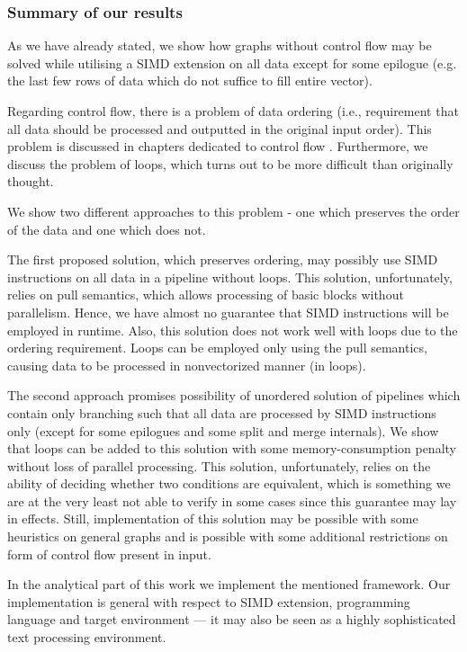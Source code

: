\subsubsection{Summary of our results}

  As we have already stated, we show how graphs without control flow may be solved while utilising a SIMD extension on all data except for some epilogue (e.g. the last few rows of data which do not suffice to fill entire vector). 


  Regarding control flow, there is a problem of data ordering (i.e., requirement that all data should be processed and outputted in the original input order). This problem is discussed in chapters dedicated to control flow .  Furthermore, we discuss the problem of loops, which turns out to be more difficult than originally thought.  


We show two different approaches to this problem - one which preserves the order of the data and one which does not. 


  The first proposed solution, which preserves ordering, may possibly use SIMD instructions on all data in a pipeline without loops. This solution, unfortunately, relies on pull semantics, which allows processing of basic blocks without parallelism. Hence, we have almost no guarantee that SIMD instructions will be employed in runtime. Also, this solution does not work well with loops due to the ordering requirement. Loops can be employed only using the pull semantics, causing data to be processed in nonvectorized manner (in loops).


The second approach promises possibility of unordered solution of pipelines which contain only branching such that all data are processed by SIMD instructions only (except for some epilogues and some split and merge internals). We show that loops can be added to this solution with some memory-consumption penalty without loss of parallel processing. This solution, unfortunately, relies on the ability of deciding whether two conditions are equivalent, which is something we are at the very least not able to verify in some cases since this guarantee may lay in effects. Still, implementation of this solution may be possible with some heuristics on general graphs and is possible with some additional restrictions on form of control flow present in input.


  In the analytical part of this work we implement the mentioned framework. Our implementation is general with respect to SIMD extension, programming language and target environment --- it may also be seen as a highly sophisticated text processing environment.


